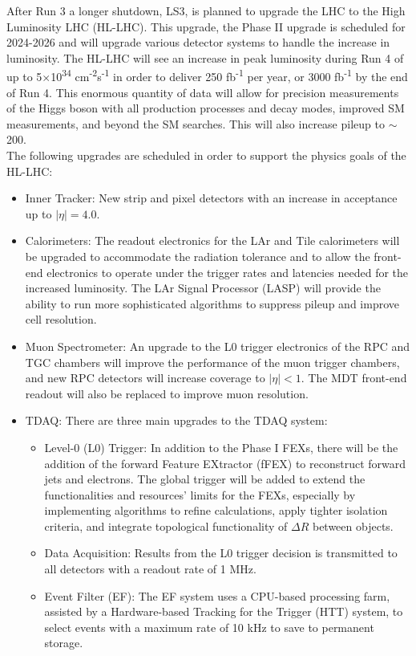After Run 3 a longer shutdown, LS3, is planned to upgrade the LHC to the High Luminosity LHC (HL-LHC).  This upgrade, the Phase II upgrade is scheduled for 2024-2026 and will upgrade various detector systems to handle the increase in luminosity.  The HL-LHC will see an increase in peak luminosity during Run 4 of up to 5$\times$10\textsuperscript{34} cm\textsuperscript{-2}s\textsuperscript{-1} in order to deliver 250 fb\textsuperscript{-1} per year, or 3000 fb\textsuperscript{-1} by the end of Run 4.  This enormous quantity of data will allow for precision measurements of the Higgs boson with all production processes and decay modes, improved SM measurements, and beyond the SM searches. This will also increase pileup to $\sim$200.  \\ %

The following upgrades are scheduled in order to support the physics goals of the HL-LHC: %
\begin{itemize}
	\item Inner Tracker: New strip and pixel detectors with an increase in acceptance up to $|\eta| = 4.0$. 
	\item Calorimeters: The readout electronics for the LAr and Tile calorimeters will be upgraded to accommodate the radiation tolerance and to allow the front-end electronics to operate under the trigger rates and latencies needed for the increased luminosity.  The LAr Signal Processor (LASP) will provide the ability to run more sophisticated algorithms to suppress pileup and improve cell resolution.  
	\item Muon Spectrometer: An upgrade to the L0 trigger electronics of the RPC and TGC chambers will improve the performance of the muon trigger chambers, and new RPC detectors will increase coverage to $|\eta|<1$.  The MDT front-end readout will also be replaced to improve muon resolution.  %
	\item TDAQ: There are three main upgrades to the TDAQ system:
	\begin{itemize}
		\item Level-0 (L0) Trigger: In addition to the Phase I FEXs, there will be the addition of the forward Feature EXtractor (fFEX) to reconstruct forward jets and electrons.  The global trigger will be added to extend the functionalities and resources' limits for the FEXs, especially by implementing algorithms to refine calculations, apply tighter isolation criteria, and integrate topological functionality of $\Delta R$ between objects.  
		\item Data Acquisition: Results from the L0 trigger decision is transmitted to all detectors with a readout rate of 1 MHz.  
		\item Event Filter (EF): The EF system uses a CPU-based processing farm, assisted by a Hardware-based Tracking for the Trigger (HTT) system, to select events with a maximum rate of 10 kHz to save to permanent storage.
	\end{itemize}
\end{itemize}

